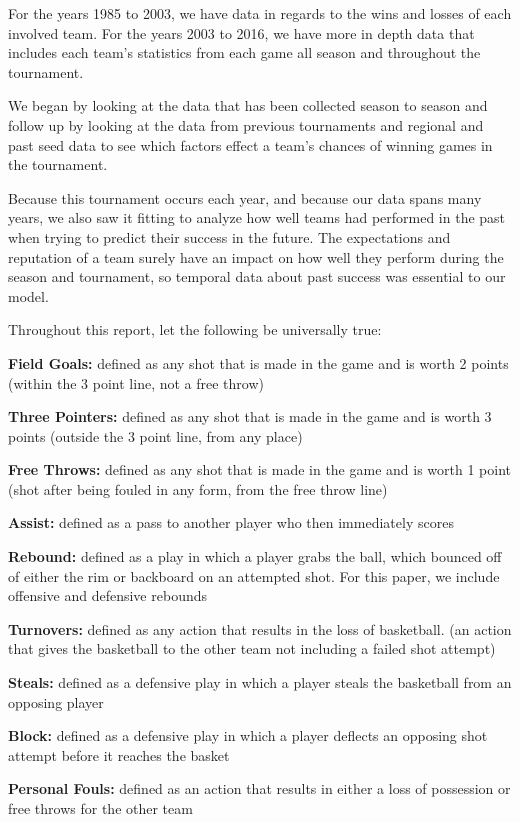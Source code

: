 \documentclass[]{scrartcl}
\begin{document}
For the years 1985 to 2003, we have data in regards to the wins and losses of each involved team. For the years 2003 to 2016, we have more in depth data that includes each team's statistics from each game all season and throughout the tournament.

We began by looking at the data that has been collected season to season and follow up by looking at the data from previous tournaments and regional and past seed data to see which factors effect a team's chances of winning games in the tournament.

Because this tournament occurs each year, and because our data spans many years, we also saw it fitting to analyze how well teams had performed in the past when trying to predict their success in the future. The expectations and reputation of a team surely have an impact on how well they perform during the season and tournament, so temporal data about past success was essential to our model.

Throughout this report, let the following be universally true:

{\textbf {Field Goals:}} defined as any shot that is made in the game and is worth 2 points (within the 3 point line, not a free throw)

{\textbf {Three Pointers:}} defined as any shot that is made in the game and is worth 3 points (outside the 3 point line, from any place)

{\textbf {Free Throws:}} defined as any shot that is made in the game and is worth 1 point (shot after being fouled in any form, from the free throw line)

{\textbf {Assist:}} defined as a pass to another player who then immediately scores

{\textbf {Rebound:}} defined as a play in which a player grabs the ball, which bounced off of either the rim or backboard on an attempted shot. For this paper, we include offensive and defensive rebounds

{\textbf {Turnovers:}} defined as any action that results in the loss of basketball. (an action that gives the basketball to the other team not including a failed shot attempt)

{\textbf {Steals:}} defined as a defensive play in which a player steals the basketball from an opposing player

{\textbf {Block:}} defined as a defensive play in which a player deflects an opposing shot attempt before it reaches the basket

{\textbf {Personal Fouls:}} defined as an action that results in either a loss of possession or free throws for the other team
\end{document}
